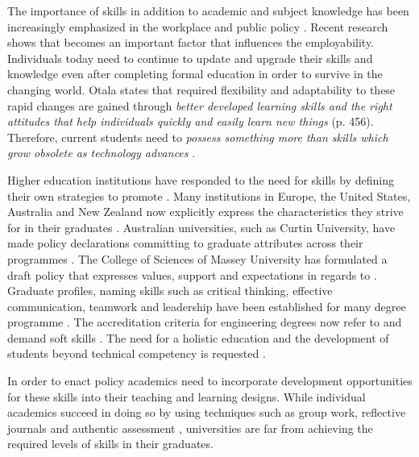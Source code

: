 
The importance of \LLLs skills in addition to academic and subject knowledge has
been increasingly emphasized in the workplace and public policy
\citep{Morgan-Klein2007,Sutherland2006}. Recent research
\citep{Simmons-McDonald2009} shows that \LLLs becomes an important factor that
influences the employability. Individuals today need to continue to update and
upgrade their skills and knowledge even after completing formal education in
order to survive in the changing world. Otala \citeyearpar{Otala1997} states
that required flexibility and adaptability to these rapid changes are gained
through \textit{better developed learning skills and the right attitudes that
help individuals quickly and easily learn new things} (p. 456). Therefore, current
students need to \textit{possess something more than skills which grow obsolete
as technology advances} \cite[p.~195]{Field2003}.

Higher education institutions have responded to the need for \LLLs skills by
defining their own strategies to promote \LLLsn. Many institutions in Europe,
the United States, Australia and New Zealand now explicitly express the \LLLs
characteristics they strive for in their graduates \citep{Scanlon2006}.
Australian universities, such as Curtin University, have made policy
declarations committing to graduate attributes across their programmes
\citep{CurtinUniversity2006}. The College of Sciences of Massey University has
formulated a draft \LLLs policy \citep{MasseyUniversity2008} that expresses
values, support and expectations in regards to \LLLsn. Graduate profiles, naming
\LLLs skills such as critical thinking, effective communication, teamwork and
leadership have been established for many degree programme
\citep{Davies2003,McAlister2003}. The accreditation criteria for engineering
degrees now refer to and demand soft skills \citep{Aller2005,Muffo2001}. The
need for a holistic education and the development of students beyond technical
competency is requested
\citep{Brakke2002,Davies2003,Dowling2006,Fallows2003,Grabowski2004,Hernon2006}.

In order to enact policy academics need to incorporate development opportunities
for these skills into their teaching and learning designs. While individual
academics succeed in doing so by using techniques such as group work, reflective
journals and authentic assessment \citep{Clarke2003,Lombardi2008}, universities
are far from achieving the required levels of \LLLs skills in their graduates.

